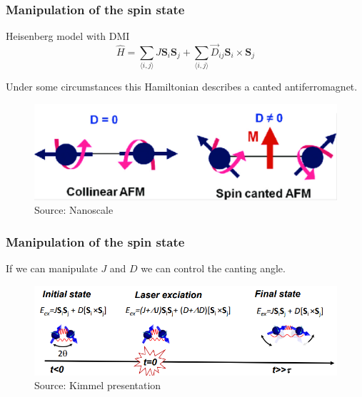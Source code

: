 \documentclass{beamer}
\begin{document}
\begin{frame}
\frametitle{Manipulation of the spin state}
\begin{block}{Heisenberg model with DMI}
\begin{equation} 
\hat{H} = \sum_{\langle i,j \rangle} J \boldsymbol{S}_i \boldsymbol{S}_j + \sum_{\langle i,j \rangle} \vec{D}_{ij}\boldsymbol{S}_i \times \boldsymbol{S}_j\nonumber
\end{equation}

Under some circumstances this Hamiltonian describes a canted antiferromagnet.

\begin{figure}
  \begin{minipage}[c]{0.6\textwidth}
    \includegraphics[width=\textwidth]{../Figures/dmi_canting.png}
  \end{minipage}\hfill
  \begin{minipage}[c]{0.2\textwidth}
    \caption{Source: Nanoscale} \label{fig:3}
  \end{minipage}
\end{figure}

\end{block}
\end{frame}

\begin{frame}
\frametitle{Manipulation of the spin state}
If we can manipulate $J$ and $D$ we can control the canting angle.
\begin{figure}
\includegraphics[width=1\linewidth]{../Figures/canted_afm.png}
\caption{Source: Kimmel presentation}
\end{figure}
\end{frame}
\end{document}

